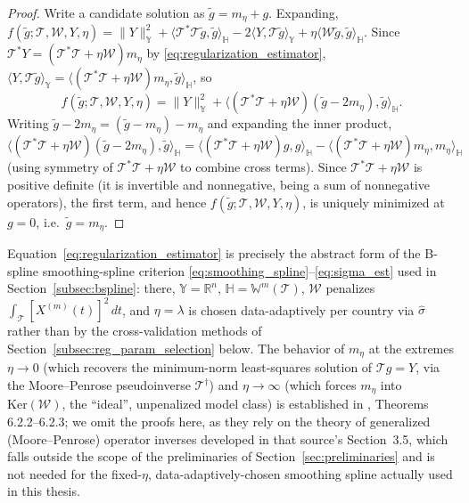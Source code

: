 \begin{proof}
Write a candidate solution as $\widetilde{g}=m_\eta+g$. Expanding,
$f(\widetilde{g};\mathcal{T},\mathcal{W},Y,\eta) = \|Y\|_{\mathbb{Y}}^2 +
\langle\mathcal{T}^*\mathcal{T}\widetilde{g},\widetilde{g}\rangle_{
\mathbb{H}} - 2\langle Y,\mathcal{T}\widetilde{g}\rangle_{\mathbb{Y}} +
\eta\langle\mathcal{W}\widetilde{g},\widetilde{g}\rangle_{\mathbb{H}}$.
Since $\mathcal{T}^*Y=(\mathcal{T}^*\mathcal{T}+\eta\mathcal{W})m_\eta$ by
\eqref{eq:regularization_estimator}, $\langle Y,\mathcal{T}\widetilde{g}
\rangle_{\mathbb{Y}} = \langle(\mathcal{T}^*\mathcal{T}+\eta\mathcal{W})
m_\eta,\widetilde{g}\rangle_{\mathbb{H}}$, so
\[
f(\widetilde{g};\mathcal{T},\mathcal{W},Y,\eta) = \|Y\|_{\mathbb{Y}}^2 +
\big\langle(\mathcal{T}^*\mathcal{T}+\eta\mathcal{W})(\widetilde{g}-2m_\eta),
\widetilde{g}\big\rangle_{\mathbb{H}}.
\]
Writing $\widetilde{g}-2m_\eta = (\widetilde{g}-m_\eta)-m_\eta$ and
expanding the inner product,
\[
\big\langle(\mathcal{T}^*\mathcal{T}+\eta\mathcal{W})(\widetilde{g}-2m_\eta),
\widetilde{g}\big\rangle_{\mathbb{H}} = \big\langle(\mathcal{T}^*\mathcal{T}
+\eta\mathcal{W})g,g\big\rangle_{\mathbb{H}} - \big\langle(\mathcal{T}^*
\mathcal{T}+\eta\mathcal{W})m_\eta,m_\eta\big\rangle_{\mathbb{H}}
\]
(using symmetry of $\mathcal{T}^*\mathcal{T}+\eta\mathcal{W}$ to combine
cross terms). Since $\mathcal{T}^*\mathcal{T}+\eta\mathcal{W}$ is positive
definite (it is invertible and nonnegative, being a sum of nonnegative
operators), the first term, and hence
$f(\widetilde{g};\mathcal{T},\mathcal{W},Y,\eta)$, is uniquely minimized at
$g=0$, i.e.\ $\widetilde{g}=m_\eta$.
\end{proof}

Equation~\eqref{eq:regularization_estimator} is precisely the abstract form
of the B-spline smoothing-spline criterion
\eqref{eq:smoothing_spline}--\eqref{eq:sigma_est} used in
Section~\ref{subsec:bspline}: there, $\mathbb{Y}=\mathbb{R}^n$,
$\mathbb{H}=\mathbb{W}^m(\mathcal{T})$, $\mathcal{W}$ penalizes
$\int_{\mathcal{T}}[X^{(m)}(t)]^2\,dt$, and $\eta=\lambda$ is chosen
data-adaptively per country via $\widehat\sigma$ rather than by the
cross-validation methods of Section~\ref{subsec:reg_param_selection}
below. The behavior of $m_\eta$ at the extremes $\eta\to 0$ (which recovers
the minimum-norm least-squares solution of $\mathcal{T}g=Y$, via the
Moore--Penrose pseudoinverse $\mathcal{T}^\dagger$) and $\eta\to\infty$
(which forces $m_\eta$ into $\mathrm{Ker}(\mathcal{W})$, the ``ideal'',
unpenalized model class) is established in \cite{hsingeubank2015}, Theorems
6.2.2--6.2.3; we omit the proofs here, as they rely on the theory of
generalized (Moore--Penrose) operator inverses developed in that source's
Section~3.5, which falls outside the scope of the preliminaries of
Section~\ref{sec:preliminaries} and is not needed for the fixed-$\eta$,
data-adaptively-chosen smoothing spline actually used in this thesis.

